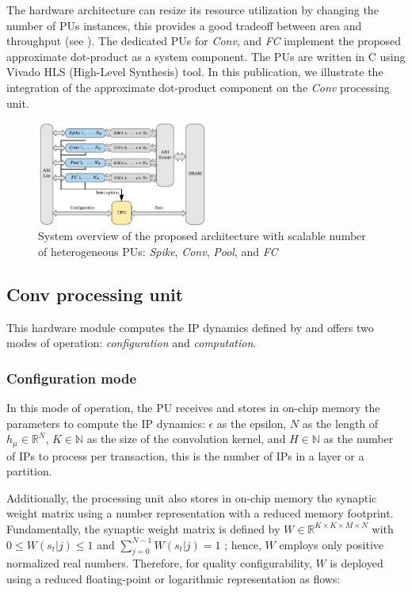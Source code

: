The hardware architecture can resize its resource utilization by changing the number of PUs instances, this provides a good tradeoff between area and throughput (see ). The dedicated PUs for \emph{Conv}, and \emph{FC} implement the proposed approximate dot-product as a system component. The PUs are written in C using Vivado HLS (High-Level Synthesis) tool. In this publication, we illustrate the integration of the approximate dot-product component on the \emph{Conv} processing unit.

\begin{figure}
	\centering
	\includegraphics[width=0.5\textwidth]{../figures/sbs_hw.pdf}
	\caption{System overview of the proposed architecture with scalable number of heterogeneous PUs: \emph{Spike}, \emph{Conv}, \emph{Pool}, and \emph{FC}}
	\label{fig:hw_sbs}
\end{figure}

\subsection{Conv processing unit}
This hardware module computes the IP dynamics defined by  and offers two modes of operation: \emph{configuration} and \emph{computation}.

\subsubsection{Configuration mode}
In this mode of operation, the PU receives and stores in on-chip memory the parameters to compute the IP dynamics: $\epsilon$ as the epsilon, $N$ as the length of $h_\mu\in\mathbb{R}^{N}$, $K\in\mathbb{N}$ as the size of the convolution kernel, and $H\in\mathbb{N}$ as the number of IPs to process per transaction, this is the number of IPs in a layer or a partition.

Additionally, the processing unit also stores in on-chip memory the synaptic weight matrix using a number representation with a reduced memory footprint. Fundamentally, the synaptic weight matrix is defined by $W\in\mathbb{R}^{K\times K\times M\times N}$ with $0\le W(s_t|j)\le1$ and $\sum_{j=0}^{N-1}W(s_t|j)=1$ \cite{rotermund2019Backpropagation}; hence, $W$ employs only positive normalized real numbers. Therefore, for quality configurability, $W$ is deployed using a reduced floating-point or logarithmic representation as flows:

